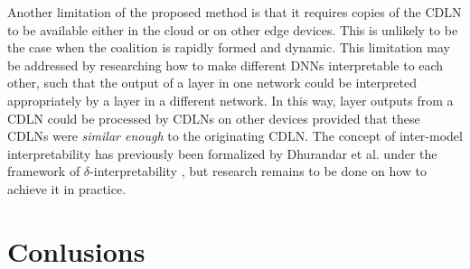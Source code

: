 Another limitation of the proposed method is that it requires copies of the CDLN to be available either in the cloud or on other edge devices. This is unlikely to be the case when the coalition is rapidly formed and dynamic. This limitation may be addressed by researching how to make different DNNs interpretable to each other, such that the output of a layer in one network could be interpreted appropriately by a layer in a different network. In this way, layer outputs from a CDLN could be processed by CDLNs on other devices provided that these CDLNs were \textit{similar enough} to the originating CDLN. The concept of inter-model interpretability has previously been formalized by Dhurandar et al. under the framework of \(\delta\)-interpretability \cite{deltaInterpretability,TIPInterpretability}, but research remains to be done on how to achieve it in practice.

\section{Conlusions}
\label{sec:conclusions}
